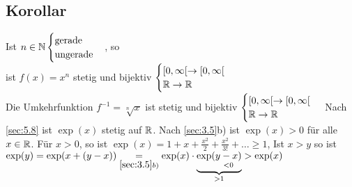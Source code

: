 \subsection{Korollar}
Ist $n \in \mathbb{N} \begin{cases}
\text{gerade}\\
\text{ungerade}
\end{cases}$, so \\
ist $f(x) = x^n$ stetig und bijektiv $\begin{cases}
[0,\infty[ \to [0, \infty[\\
\mathbb{R} \to \mathbb{R}
\end{cases}$\\
Die Umkehrfunktion $f^{-1} = \sqrt[n]{x}$ ist stetig und bijektiv $\begin{cases}
[0,\infty[ \to [0, \infty[\\
\mathbb{R} \to \mathbb{R}
\end{cases}$
Nach \ref{sec:5.8} ist $\exp(x)$ stetig auf $\mathbb{R}$. Nach \ref{sec:3.5}b) ist $\exp(x) > 0$ für alle $x \in \mathbb{R}$. Für $x > 0$, so ist $\exp(x) = 1 + x + \frac{x^2}{2} + \frac{x^2}{3!} + \ldots \geq 1$, Ist $ x > y$ so ist $\exp(y) = \exp(x + (y-x)) \underset{\ref{sec:3.5}b)}{=} \exp(x) \cdot \underbrace{\exp(\underset{<0}{y-x)}}_{> 1} > \exp(x)$\\
